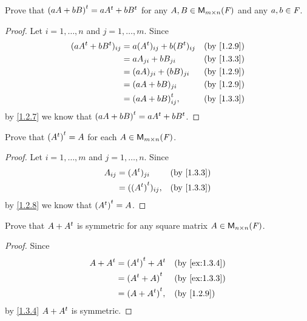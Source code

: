 \exercisesection

\setcounter{ex}{2}
\begin{ex}\label{ex:1.3.3}
  Prove that \({(aA + bB)}^{t} = a{A}^{t} + b{B}^{t}\) for any \(A, B \in \mathsf{M}_{{m} \times n}({\mathit{F}})\) and any \(a, b \in \mathit{F}\).
\end{ex}

\begin{proof}
  Let \(i = 1, \dots, n\) and \(j = 1, \dots, m\).
  Since
  \begin{align*}
    (a\tp{A} + b\tp{B})_{i j} & = a(\tp{A})_{i j} + b(\tp{B})_{i j} &  & \text{(by \cref{1.2.9})} \\
                              & = aA_{j i} + bB_{j i}               &  & \text{(by \cref{1.3.3})} \\
                              & = (aA)_{j i} + (bB)_{j i}           &  & \text{(by \cref{1.2.9})} \\
                              & = (aA + bB)_{j i}                   &  & \text{(by \cref{1.2.9})} \\
                              & = \tp{(aA + bB)}_{i j},             &  & \text{(by \cref{1.3.3})}
  \end{align*}
  by \cref{1.2.7} we know that \({(aA + bB)}^{t} = a{A}^{t} + b{B}^{t}\).
\end{proof}

\begin{ex}\label{ex:1.3.4}
  Prove that \({({A}^{t})}^{t} = A\) for each \(A \in \mathsf{M}_{{m} \times n}({\mathit{F}})\).
\end{ex}

\begin{proof}
  Let \(i = 1, \dots, m\) and \(j = 1, \dots, n\).
  Since
  \begin{align*}
    A_{i j} & = (\tp{A})_{j i}         &  & \text{(by \cref{1.3.3})} \\
            & = (\tp{(\tp{A})})_{i j}, &  & \text{(by \cref{1.3.3})}
  \end{align*}
  by \cref{1.2.8} we know that \({({A}^{t})}^{t} = A\).
\end{proof}

\begin{ex}\label{ex:1.3.5}
  Prove that \(A + {A}^{t}\) is symmetric for any square matrix \(A \in \mathsf{M}_{{n} \times n}({\mathit{F}})\).
\end{ex}

\begin{proof}
  Since
  \begin{align*}
    A + \tp{A} & = \tp{(\tp{A})} + \tp{A} &  & \text{(by \cref{ex:1.3.4})} \\
               & = \tp{(\tp{A} + A)}      &  & \text{(by \cref{ex:1.3.3})} \\
               & = \tp{(A + \tp{A})},     &  & \text{(by \cref{1.2.9})}
  \end{align*}
  by \cref{1.3.4} \(A + {A}^{t}\) is symmetric.
\end{proof}

